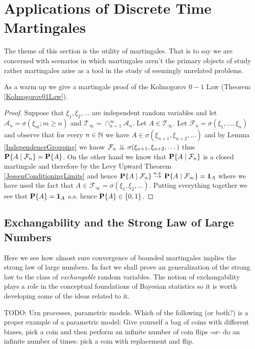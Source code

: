 \section {Applications of Discrete Time Martingales}

The theme of this section is the utility of martingales.  That is to
say we are concerned with scenarios in which martingales aren't the
primary objects of study rather martingales arise as a tool in the study of
seemingly unrelated problems.

As a warm up we give a martingale proof of the Kolmogorov $0-1$ Law
(Theorem \ref{Kolmogorov01Law}).
\begin{proof}
Suppose that $\xi_1, \xi_2, \dotsc$ are independent random variables
and let $\mathcal{A}_n = \sigma(\xi_m; m \geq n)$ and
$\mathcal{T}_\infty = \cap_{n =1}^\infty \mathcal{A}_n$.  Let $A \in
\mathcal{T}_\infty$.  Let $\mathcal{F}_n = \sigma(\xi_1, \dotsc,
\xi_n)$ and observe that for every $n \in \naturals$ we have $A \in
\sigma(\xi_{n+1}, \xi_{n+2}, \dotsc)$ and by Lemma \ref{IndependenceGrouping} we know
$\mathcal{F}_n \Independent \sigma(\xi_{n+1}, \xi_{n+2}, \dotsc)$ thus
$\cprobability{\mathcal{F}_n}{A} = \probability{A}$.  On the other
hand we know that $\cprobability{\mathcal{F}_n}{A}$ is a closed
martingale and therefore by the Levy Upward Theorem
\ref{JessenConditioningLimits} and hence
$\cprobability{\mathcal{F}_n}{A} \toas
\cprobability{\mathcal{F}_\infty}{A} = \characteristic{A}$ where we have
used the fact that $A \in \mathcal{F}_\infty = \sigma(\xi_1, \xi_2,
\dotsc)$.  Putting everything together we see that $\probability{A} =
\characteristic{A}$ a.s. hence $\probability{A}  \in \lbrace 0,1 \rbrace$.
\end{proof}

\subsection{Exchangability and the Strong Law of Large Numbers}

Here we see how almost sure convergence of bounded martingales implies the strong law of large
numbers.  In fact we shall prove an generalization of the strong law to the class of 
\emph{exchangable} random variables.  The notion of exchangability plays a role in the
conceptual foundations of Bayesian statistics so it is worth developing some of the ideas
related to it.

TODO: Urn processes, parametric models.  Which of the following (or both?) is a proper example of a 
parametric model: Give yourself a bag of coins with different biases, pick a coin and then perform an 
infinite number of coin flips -or- do an infinite number of times: pick a coin with replacement and flip.


